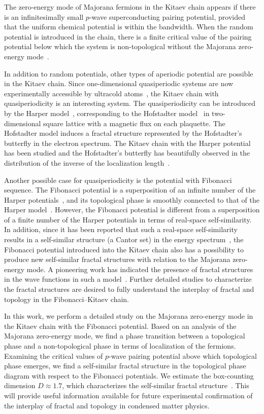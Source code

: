 \documentclass[%
superscriptaddress,
preprint,
amsmath,amssymb,
]{revtex4-1}
\begin{document}
The zero-energy mode of Majorana fermions in the Kitaev chain appears if there is an infinitesimally small $p$-wave superconducting pairing potential, provided that the uniform chemical potential is within the bandwidth. When the random potential is introduced in the chain, there is a finite critical value of the pairing potential below which the system is non-topological without the Majorana zero-energy mode~\cite{DeGottardi13}. 

In addition to random potentials, other types of aperiodic potential are possible in the Kitaev chain.
Since one-dimensional quasiperiodic systems are now experimentally accessible by ultracold atoms~\cite{Modugno10,Kraus16}, the Kitaev chain with quasiperiodicity is an interesting system.
The quasiperiodicity can be introduced by the Harper model~\cite{Harper55}, corresponding to the Hofstadter model~\cite{Azbel64,Hofstadter76} in two-dimensional square lattice with a magnetic flux on each plaquette.
The Hofstadter model induces a fractal structure represented by the Hofstadter's butterfly in the electron spectrum.
The Kitaev chain with the Harper potential has been studied and the Hofstadter's butterfly has beautifully observed in the distribution of the inverse of the localization length~\cite{DeGottardi13}.

Another possible case for quasiperiodicity is the potential with Fibonacci sequence. 
The Fibonacci potential is a superposition of an infinite number of the Harper potentials~\cite{Naumis08}, and its topological phase is smoothly connected to that of the Harper model~\cite{Kraus12}.
However, the Fibonacci potential is different from a superposition of a finite number of the Harper potentials in terms of real-space self-similarity.
In addition, since it has been reported that such a real-space self-similarity results in a self-similar structure (a Cantor set) in the energy spectrum~\cite{Kohmoto83,Kohmoto87}, the Fibonacci potential introduced into the Kitaev chain also has a possibility to produce new self-similar fractal structures with relation to the Majorana zero-energy mode.
A pioneering work has indicated the presence of fractal structures in the wave functions in such a model~\cite{Satija13}. Further detailed studies to characterize the fractal structures are desired to fully understand the interplay of fractal and topology in the Fibonacci--Kitaev chain. 

In this work, we perform a detailed study on the Majorana zero-energy mode in the Kitaev chain with the Fibonacci potential.
Based on an analysis of the Majorana zero-energy mode, we find a phase transition between a topological phase and a non-topological phase in terms of localization of the fermions.  
Examining the critical values of $p$-wave pairing potential above which topological phase emerges, we find a self-similar fractal structure in the topological phase diagram with respect to the Fibonacci potentials. We estimate the box-counting dimension $D\approx 1.7$, which characterizes the self-similar fractal structure~\cite{Mandelbrot77}. This will provide useful information available for future experimental confirmation of the interplay of fractal and topology in condensed matter physics.
\end{document}
